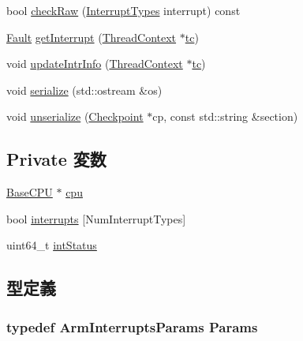 \begin{DoxyCompactItemize}
\item 
bool \hyperlink{classArmISA_1_1Interrupts_a4240797ee6bfe09270680eccc63bbb9d}{checkRaw} (\hyperlink{namespaceArmISA_acdad6d81b9a94402ce3979d531ae4f40}{InterruptTypes} interrupt) const 
\item 
\hyperlink{classRefCountingPtr}{Fault} \hyperlink{classArmISA_1_1Interrupts_ae603c88d759977611d3bcc6e2deb61ae}{getInterrupt} (\hyperlink{classThreadContext}{ThreadContext} $\ast$\hyperlink{namespaceArmISA_a5aff829af55e65b802d83dfcef4e9dd0}{tc})
\item 
void \hyperlink{classArmISA_1_1Interrupts_a00892e9b06edcba6c3c27454d6235100}{updateIntrInfo} (\hyperlink{classThreadContext}{ThreadContext} $\ast$\hyperlink{namespaceArmISA_a5aff829af55e65b802d83dfcef4e9dd0}{tc})
\item 
void \hyperlink{classArmISA_1_1Interrupts_a53e036786d17361be4c7320d39c99b84}{serialize} (std::ostream \&os)
\item 
void \hyperlink{classArmISA_1_1Interrupts_af22e5d6d660b97db37003ac61ac4ee49}{unserialize} (\hyperlink{classCheckpoint}{Checkpoint} $\ast$cp, const std::string \&section)
\end{DoxyCompactItemize}
\subsection*{Private 変数}
\begin{DoxyCompactItemize}
\item 
\hyperlink{classBaseCPU}{BaseCPU} $\ast$ \hyperlink{classArmISA_1_1Interrupts_a7a31ca9fefb2fe821f29a270678912db}{cpu}
\item 
bool \hyperlink{classArmISA_1_1Interrupts_a1a97fbd95b3d09130494277ce6dcca67}{interrupts} \mbox{[}NumInterruptTypes\mbox{]}
\item 
uint64\_\-t \hyperlink{classArmISA_1_1Interrupts_a7bd80958fef7b80f720d1e764c63adb4}{intStatus}
\end{DoxyCompactItemize}


\subsection{型定義}
\hypertarget{classArmISA_1_1Interrupts_a747dfcc35968d9e2b82998fae6408d6a}{
\subsubsection[{Params}]{\setlength{\rightskip}{0pt plus 5cm}typedef ArmInterruptsParams {\bf Params}}}
\label{classArmISA_1_1Interrupts_a747dfcc35968d9e2b82998fae6408d6a}


